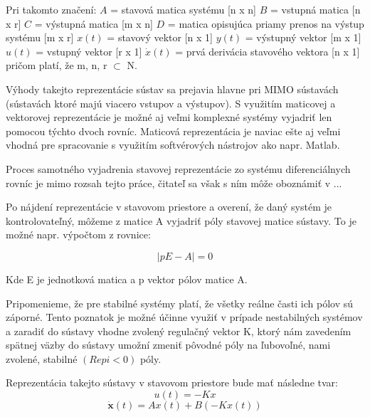 Pri takomto značení:\newline
$A$ = stavová matica systému [n x n]\newline
$B$ = vstupná matica [n x r]\newline
$C$ = výstupná matica [m x n]\newline
$D$ = matica opisujúca priamy prenos na výstup systému [m x r]\newline
$x(t)$ = stavový vektor [n x 1]\newline
$y(t)$ = výstupný vektor [m x 1]\newline
$u(t)$ = vstupný vektor [r x 1]\newline
$\dot{x}(t)$ = prvá derivácia stavového vektora [n x 1]
pričom platí, že m, n, r $\subset$ N. 

Výhody takejto reprezentácie sústav sa prejavia hlavne pri MIMO sústavách (sústavách ktoré majú viacero vstupov a výstupov). S využitím maticovej a vektorovej reprezentácie je možné aj veľmi komplexné systémy vyjadriť len pomocou týchto dvoch rovníc. Maticová reprezentácia je naviac ešte aj veľmi vhodná pre spracovanie s využitím softvérových nástrojov ako napr. Matlab.

Proces samotného vyjadrenia stavovej reprezentácie zo systému diferenciálnych rovníc je mimo rozsah tejto práce, čitateľ sa však s ním môže oboznámiť v ...


Po nájdení reprezentácie v stavovom priestore a overení, že daný systém je kontrolovateľný, môžeme z matice A vyjadriť póly stavovej matice sústavy. To je možné napr. výpočtom z rovnice:

\begin{equation}
\mid pE - A \mid = 0 
\end{equation}

Kde E je jednotková matica a p vektor pólov matice A.

	Pripomenieme, že pre stabilné systémy platí, že všetky reálne časti ich pólov sú záporné. Tento poznatok je možné účinne využiť v prípade nestabilných systémov a zaradiť do sústavy vhodne zvolený regulačný vektor K, ktorý nám zavedením spätnej väzby do sústavy umožní zmeniť pôvodné póly na ľubovoľné, nami zvolené, stabilné $(Re{pi}<0)$ póly. 

Reprezentácia takejto sústavy v stavovom priestore bude mať následne tvar:
\begin{equation}
u( t ) = -Kx
\label{eq:ut}
\end{equation}
\begin{equation}
\dot{\textbf{x}}(t) = Ax(t) + B(-Kx(t))
\label{eq:xDot}
\end{equation}

